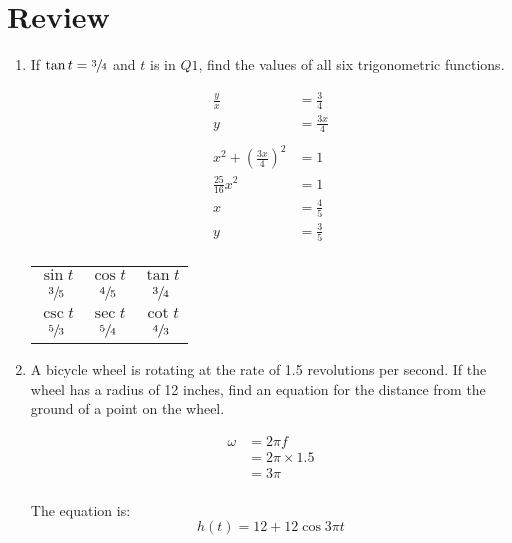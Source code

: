 \documentclass{exam}
\begin{document}
  \section{Review}
  \begin{enumerate}
    \item If $\tan t = \sfrac{3}{4}$ and $t$ is in $Q1$, find the values of all six trigonometric functions.

      \begin{solution}
        \begin{align*}
          \frac{y}{x} & = \frac{3}{4} \\
          y           & = \frac{3x}{4} \\
          \\
          x^2 + \left( \frac{3x}{4} \right)^2 &= 1 \\
          \frac{25}{16} x^2 & = 1 \\
          x                 & = \frac{4}{5} \\
          y                 & = \frac{3}{5} \\
        \end{align*}

        \begin{tabular}[H]{ccc}
          \toprule
          $\sin t$       & $\cos t$       & $\tan t$      \\
          $\sfrac{3}{5}$ & $\sfrac{4}{5}$ & $\sfrac{3}{4}$ \\

          \midrule

          $\csc t$       & $\sec t$       & $\cot t$ \\
          $\sfrac{5}{3}$ & $\sfrac{5}{4}$ & $\sfrac{4}{3}$ \\

          \bottomrule
        \end{tabular}

      \end{solution}

    \item A bicycle wheel is rotating at the rate of 1.5 revolutions per second.  If the wheel has a radius of 12
      inches, find an equation for the distance from the ground of a point on the wheel.

      \begin{solution}
        \begin{align*}
          \omega & = 2 \pi f \\
                 & = 2 \pi \times 1.5 \\
                 & = 3 \pi \\
        \end{align*}

        The equation is:
        \[
          h(t) = 12 + 12 \cos 3 \pi t 
        \]
      \end{solution}

  \end{enumerate}
\end{document}
